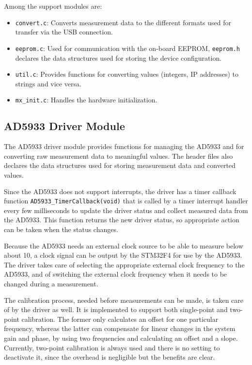 Among the support modules are:
%
\begin{itemize}
	\item \verb!convert.c!: Converts measurement data to the different formats used for transfer via the USB connection.
  
  \item \verb!eeprom.c!: Used for communication with the on-board EEPROM, \verb!eeprom.h! declares the data
        structures used for storing the device configuration.
  
  \item \verb!util.c!: Provides functions for converting values (integers, IP addresses) to strings and vice versa.
  
  \item \verb!mx_init.c!: Handles the hardware initialization.
\end{itemize}


\subsection{AD5933 Driver Module}

The AD5933 driver module provides functions for managing the AD5933 and for converting raw measurement data to
meaningful values. The header files also declares the data structures used for storing measurement data and converted
values.

Since the AD5933 does not support interrupts, the driver has a timer callback function \verb!AD5933_TimerCallback(void)!
that is called by a timer interrupt handler every few milliseconds to update the driver status and collect measured
data from the AD5933. This function returns the new driver status, so appropriate action can be taken when the status
changes.

Because the AD5933 needs an external clock source to be able to measure below about \unit{10}{\kilo\hertz},
a clock signal can be output by the STM32F4 for use by the AD5933. The driver takes care of selecting the appropriate
external clock frequency to the AD5933, and of switching the external clock frequency when it needs to be changed
during a measurement.

The calibration process, needed before measurements can be made, is taken care of by the driver as well.
It is implemented to support both single-point and two-point calibration. The former only calculates an offset for one
particular frequency, whereas the latter can compensate for linear changes in the system gain and phase, by using two
frequencies and calculating an offset and a slope.
Currently, two-point calibration is always used and there is no setting to deactivate it, since the overhead is
negligible but the benefits are clear.

